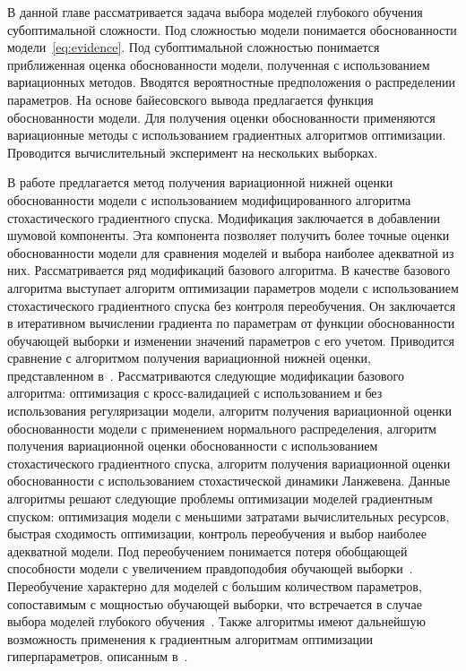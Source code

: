 В данной главе рассматривается задача выбора моделей глубокого обучения субоптимальной сложности. Под сложностью модели понимается обоснованности модели~\eqref{eq:evidence}. Под субоптимальной сложностью понимается приближенная оценка обоснованности модели, полученная с использованием вариационных методов. Вводятся вероятностные предположения о распределении параметров. На основе байесовского вывода предлагается функция обоснованности модели. Для получения оценки обоснованности применяются вариационные методы с использованием градиентных алгоритмов оптимизации. Проводится вычислительный эксперимент на нескольких выборках.

В работе предлагается метод получения вариационной нижней оценки  обоснованности модели с использованием модифицированного алгоритма стохастического градиентного спуска. {Модификация заключается в добавлении шумовой компоненты. Эта компонента позволяет получить более точные оценки обоснованности модели для сравнения моделей и выбора наиболее адекватной из них. } Рассматривается ряд модификаций базового алгоритма. {В качестве базового алгоритма выступает алгоритм оптимизации параметров модели с использованием стохастического градиентного спуска без контроля переобучения. Он заключается в итеративном вычислении градиента по параметрам от функции обоснованности обучающей выборки и изменении значений параметров с его учетом.} Приводится сравнение с алгоритмом получения вариационной нижней оценки, представленном в~\cite{nips}. {Рассматриваются следующие модификации базового алгоритма:
оптимизация с кросс-валидацией с использованием и без использования регуляризации модели,
алгоритм получения вариационной оценки обоснованности модели с применением нормального распределения,
алгоритм получения вариационной оценки обоснованности с использованием стохастического градиентного спуска,
алгоритм получения вариационной оценки обоснованности с использованием стохастической динамики Ланжевена.}
 { Данные алгоритмы решают следующие проблемы оптимизации моделей  градиентным спуском: оптимизация модели с меньшими затратами вычислительных ресурсов, быстрая сходимость оптимизации, контроль переобучения и выбор наиболее адекватной модели.
Под переобучением понимается потеря обобщающей способности модели с увеличением правдоподобия обучающей выборки~\cite{mackay}. Переобучение характерно для моделей с большим количеством параметров, сопоставимым с мощностью обучающей выборки, что встречается в случае выбора моделей глубокого обучения~\cite{hinton_rbm, suts}.
}
Также алгоритмы имеют дальнейшую возможность применения к градиентным алгоритмам оптимизации гиперпараметров, описанным в~\cite{hyper}.

